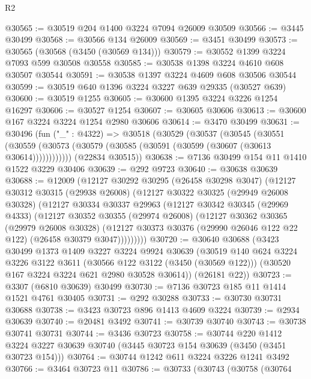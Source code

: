 \begin{lexlean}{R2}
\begin{coremodule}
@30565 := @30519 @204 @1400 @3224 @7094 @26009 @30509
@30566 := @3445 @30499
@30568 := @30566 @134 @26009
@30569 := @3451 @30499
@30573 := @30565 (@30568 (@3450 (@30569 @134)))
@30579 := @30552 @1399 @3224 @7093 @599 @30508 @30558
@30585 := @30538 @1398 @3224 @4610 @608 @30507 @30544
@30591 := @30538 @1397 @3224 @4609 @608 @30506 @30544
@30599 := @30519 @640 @1396 @3224 @3227 @639 @29335 (@30527 @639)
@30600 := @30519 @1255
@30605 := @30600 @1395 @3224 @3226 @1254 @16297
@30606 := @30527 @1254
@30607 := @30605 @30606
@30613 := @30600 @167 @3224 @3224 @1254 @2980 @30606
@30614 := @3470 @30499
@30631 := @30496
    (fun ("_" : @4322) =>
    @30518
      (@30529
        (@30537
          (@30545
            (@30551
              (@30559 (@30573 (@30579 (@30585 (@30591 (@30599 (@30607 (@30613 @30614))))))))))))
      (@22834 @30515))
@30638 := @7136 @30499 @154 @11 @1410 @1522 @3229 @30406
@30639 := @292 @9723
@30640 := @30638 @30639
@30688 := @12009
    (@12127
      @30292
      @30295
      (@26458 @30298 @3047)
      (@12127
        @30312
        @30315
        (@29938 @26008)
        (@12127
          @30322
          @30325
          (@29949 @26008 @30328)
          (@12127
            @30334
            @30337
            @29963
            (@12127
              @30342
              @30345
              (@29969 @4333)
              (@12127
                @30352
                @30355
                (@29974 @26008)
                (@12127
                  @30362
                  @30365
                  (@29979 @26008 @30328)
                  (@12127 @30373 @30376 (@29990 @26046 @122 @22 @122) (@26458 @30379 @3047)))))))))
@30720 := @30640
    @30688
    (@3423
      @30499
      @1373
      @1409
      @3227
      @3224
      @9924
      @30639
      (@30519
        @140
        @624
        @3224
        @3226
        @3122
        @3611
        (@30566 @122 @3122 (@3450 (@30569 @122)))
        (@30520 @167 @3224 @3224 @621 @2980 @30528 @30614))
      (@26181 @22))
@30723 := @3307 (@6810 @30639) @30499
@30730 := @7136 @30723 @185 @11 @1414 @1521 @4761 @30405
@30731 := @292 @30288
@30733 := @30730 @30731 @30688
@30738 := @3423 @30723 @896 @1413 @4609 @3224
@30739 := @2934 @30639
@30740 := @20481 @3492
@30741 := @30739 @30740
@30743 := @30738 @30741 @30731
@30744 := @3436 @30723
@30758 := @30744
    @220
    @1412
    @3224
    @3227
    @30639
    @30740
    (@3445 @30723 @154 @30639 (@3450 (@3451 @30723 @154)))
@30764 := @30744 @1242 @611 @3224 @3226 @1241 @3492
@30766 := @3464 @30723 @11
@30786 := @30733
    (@30743
      (@30758
        (@30764

\end{coremodule}
\end{lexlean}
